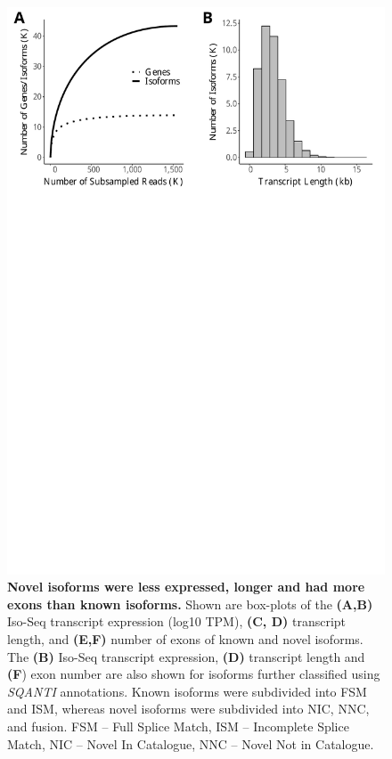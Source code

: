 \begin{figure}[!htp]
	\begin{center}
		\includegraphics[page=4,scale = 0.55]{Figures/IsoSeqWholeTranscriptome.pdf}
	\end{center}
	\captionsetup{width=0.95\textwidth}
	\caption[Comparison of known and novel isoforms detected in the mouse cortex]%
	{\textbf{Novel isoforms were less expressed, longer and had more exons than known isoforms.} Shown are box-plots of the \textbf{(A,B)} Iso-Seq transcript expression (log10 TPM), \textbf{(C, D)} transcript length, and \textbf{(E,F)} number of exons of known and novel isoforms. The \textbf{(B)} Iso-Seq transcript expression, \textbf{(D)} transcript length and \textbf{(F}) exon number are also shown for isoforms further classified using \textit{SQANTI} annotations. Known isoforms were subdivided into FSM and ISM, whereas novel isoforms were subdivided into NIC, NNC, and fusion. FSM – Full Splice Match, ISM – Incomplete Splice Match, NIC – Novel In Catalogue, NNC – Novel Not in Catalogue.}   
	\label{fig:isoseq_whole_novel_known_iso_corr}
\end{figure}
	
